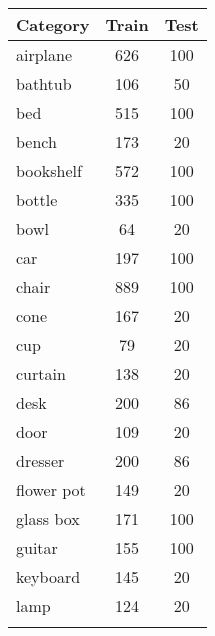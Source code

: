 \begin{table}[]
	\centering
	\begin{tabular}[t]{lcc}
		\hline
		\textbf{Category} & \textbf{Train} & \textbf{Test} \\ \hline
		airplane          & 626            & 100           \\
		bathtub           & 106            & 50            \\
		bed               & 515            & 100           \\
		bench             & 173            & 20            \\
		bookshelf         & 572            & 100           \\
		bottle            & 335            & 100           \\
		bowl              & 64             & 20            \\
		car               & 197            & 100           \\
		chair             & 889            & 100           \\
		cone              & 167            & 20            \\
		cup               & 79             & 20            \\
		curtain           & 138            & 20            \\
		desk              & 200            & 86            \\
		door              & 109            & 20            \\
		dresser           & 200            & 86            \\
		flower pot        & 149            & 20            \\
		glass box         & 171            & 100           \\
		guitar            & 155            & 100           \\
		keyboard          & 145            & 20            \\
		lamp              & 124            & 20            \\
		                  &                &               \\ \hline
		                               

\end{tabular}
\end{table}
